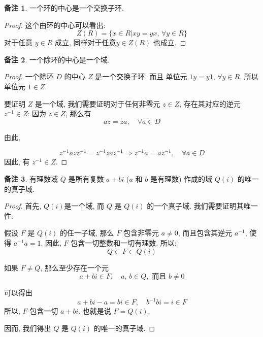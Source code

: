 \documentclass[utf8]{ctexbook}
\theoremstyle{definition}
\newtheorem{memo}{备注}[section]
\begin{document}
\begin{memo}
一个环的中心是一个交换子环.
\end{memo}


\begin{proof}
这个由环的中心可以看出:
\begin{equation}
Z(R) = \{ x \in R | xy = yx, \, \forall y \in R \}
\end{equation}
对于任意 $y \in R$ 成立, 同样对于任意$y \in Z(R)$ 也成立.
\end{proof}


\begin{memo}
一个除环的中心是一个域.
\end{memo}

\begin{proof}
一个除环 $D$ 的中心 $Z$ 是一个交换子环. 而且 单位元 $1 y = y 1$, $\forall y \in R$, 所以 单位元 $1 \in Z$.

要证明 $Z$ 是一个域, 我们需要证明对于任何非零元 $z \in Z$, 存在其对应的逆元 $z^{-1} \in Z$: 因为 $z \in Z$, 那么有
\begin{equation}
az = za, \quad \forall a \in D
\end{equation}

由此,

\begin{equation}
z^{-1} az z^{-1} = z^{-1} za z^{-1}  \Rightarrow z^{-1} a = a  z^{-1} , \quad \forall a \in D
\end{equation}
因此, 有 $z^{-1} \in Z$.

\end{proof}

\begin{memo}
有理数域 $Q$ 是所有复数 $a + bi$ ($a$ 和 $b$ 是有理数) 作成的域 $Q(i)$ 的唯一的真子域.
\end{memo}

\begin{proof}
首先, $Q(i)$是一个域, 而 $Q$ 是 $Q(i)$ 的一个真子域. 我们需要证明其唯一性:

假设 $F$ 是 $Q(i)$ 的任一子域, 那么 $F$ 包含非零元 $a \neq 0$, 而且包含其逆元 $a^{-1}$, 使得 $a^{-1} a = 1$. 因此, $F$ 包含一切整数和一切有理数. 所以:
\begin{equation}
Q \subset F \subset Q(i)
\end{equation}

如果 $F \neq Q$, 那么至少存在一个元
\begin{equation}
a + bi \in F, \quad a, \, b \in Q, \mbox{  而且  }  b \neq 0
\end{equation}

可以得出
\begin{equation}
a + bi - a  = bi \in F, \quad b^{-1} b i = i \in F
\end{equation}
所以, $F$ 包含一切 $a+ bi$. 也就是说 $F = Q(i)$.

因而, 我们得出 $Q$ 是 $Q(i)$ 的唯一的真子域.

\end{proof}
\end{document}

